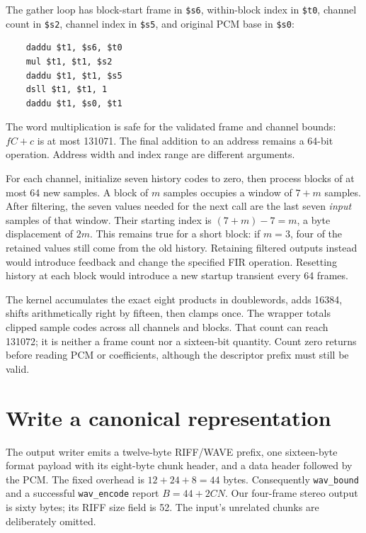 The gather loop has block-start frame in \texttt{\$s6}, within-block index in
\texttt{\$t0}, channel count in \texttt{\$s2}, channel index in
\texttt{\$s5}, and original PCM base in \texttt{\$s0}:
\begin{verbatim}
    daddu $t1, $s6, $t0
    mul $t1, $t1, $s2
    daddu $t1, $t1, $s5
    dsll $t1, $t1, 1
    daddu $t1, $s0, $t1
\end{verbatim}
The word multiplication is safe for the validated frame and channel bounds:
$fC+c$ is at most 131071. The final addition to an address remains a
64-bit operation. Address width and index range are different arguments.

For each channel, initialize seven history codes to zero, then process blocks
of at most 64 new samples. A block of $m$ samples occupies a window of $7+m$
samples. After filtering, the seven values needed for the next call are the
last seven \emph{input} samples of that window. Their starting index is
$(7+m)-7=m$, a byte displacement of $2m$. This remains true for a short block:
if $m=3$, four of the retained values still come from the old history.
Retaining filtered outputs instead would introduce feedback and change the
specified FIR operation. Resetting history at each block would introduce a new
startup transient every 64 frames.

The kernel accumulates the exact eight products in doublewords, adds 16384,
shifts arithmetically right by fifteen, then clamps once. The wrapper totals
clipped sample codes across all channels and blocks. That count can reach
131072; it is neither a frame count nor a sixteen-bit quantity. Count zero
returns before reading PCM or coefficients, although the descriptor prefix
must still be valid.


\section{Write a canonical representation}

The output writer emits a twelve-byte RIFF/WAVE prefix, one sixteen-byte format
payload with its eight-byte chunk header, and a data header followed by the PCM.
The fixed overhead is $12+24+8=44$ bytes. Consequently
\texttt{wav\_bound} and a successful \texttt{wav\_encode} report
$B=44+2CN$. Our four-frame stereo output is sixty bytes; its RIFF size field
is 52. The input's unrelated chunks are deliberately omitted.

